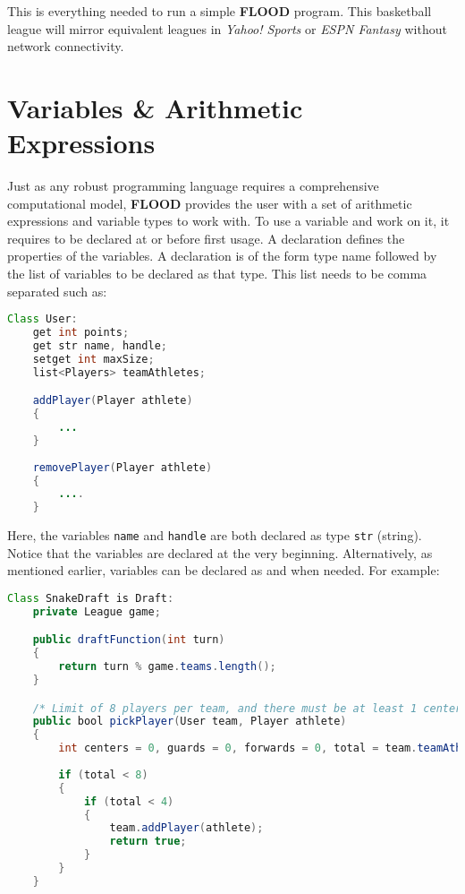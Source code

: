 \documentclass[12pt]{report}
\begin{document}
This is everything needed to run a simple \textbf{FLOOD} program. This basketball league will mirror equivalent leagues in \textit{Yahoo! Sports} or \textit{ESPN Fantasy} without network connectivity.  

\section{Variables \& Arithmetic Expressions}

Just as any robust programming language requires a comprehensive computational model, \textbf{FLOOD} provides the user with a set of arithmetic expressions and variable types to work with. To use a variable and work on it, it requires to be declared at or before first usage. A declaration defines the properties of the variables. A declaration is of the form type name followed by the list of variables to be declared as that type. This list needs to be comma separated such as:

\begin{singlespace}
\begin{lstlisting}[language=Java,label=some-code,caption=User.fld]
Class User:
	get int points;
	get str name, handle;
	setget int maxSize;
	list<Players> teamAthletes;

	addPlayer(Player athlete)
	{
		...
	}
	
	removePlayer(Player athlete)
	{
		....
	}
\end{lstlisting}
\end{singlespace}

Here, the variables \texttt{name} and \texttt{handle} are both declared as type \texttt{str} (string). Notice that the variables are declared at the very beginning.  Alternatively, as mentioned earlier, variables can be declared as and when needed. For example:

\begin{singlespace}
\begin{lstlisting}[language=Java,label=some-code,caption=SnakeDraft.fld]
Class SnakeDraft is Draft:
	private League game;

	public draftFunction(int turn)
	{
		return turn % game.teams.length();
	}

	/* Limit of 8 players per team, and there must be at least 1 center, 2 guards and 2 forwards per team. */
	public bool pickPlayer(User team, Player athlete)
	{
		int centers = 0, guards = 0, forwards = 0, total = team.teamAthletes.size();
		
		if (total < 8)
		{
			if (total < 4)
			{
				team.addPlayer(athlete);
				return true;
			}
		}
	}
\end{lstlisting}
\end{singlespace}
\end{document}
